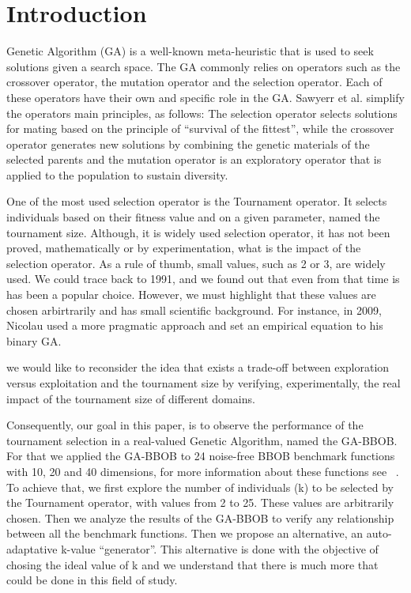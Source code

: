 \section{Introduction}\label{intro}

 Genetic Algorithm (GA) is a well-known meta-heuristic that is used to seek solutions given a search space. The GA commonly relies on operators such as the crossover operator, the mutation operator and the selection operator. Each of these operators have their own and specific role in the GA. Sawyerr et al. simplify the operators main principles, as follows: The selection operator selects solutions for mating based on the principle of ``survival of the fittest'', while the crossover operator generates new solutions by combining the genetic materials of the selected parents and the mutation operator is an exploratory operator that is applied to the population to sustain diversity.

 One of the most used selection operator is the Tournament operator. It selects individuals based on their fitness value and on a given parameter, named the tournament size. Although, it is widely used selection operator, it has not been proved, mathematically or by experimentation, what is the impact of the selection operator. As a rule of thumb, small values, such as 2 or 3, are widely used. We could trace back to 1991,  and we found out that even from that time is has been a popular choice. However, we must highlight that these values are chosen arbirtrarily and has small scientific background. For instance, in 2009, Nicolau used a more pragmatic approach and set an empirical equation to his binary GA. 
 
 
  we would like to reconsider the idea that exists a trade-off between exploration versus exploitation and the tournament size by verifying, experimentally, the real impact of the tournament size of different domains. 
 
 Consequently, our goal in this paper, is to observe the performance of the tournament selection in a real-valued Genetic Algorithm, named the GA-BBOB. For that we applied the GA-BBOB to 24 noise-free BBOB benchmark functions with 10, 20 and 40 dimensions, for more information about these functions see ~\cite{hansen2010real}. To achieve that, we first explore the number of individuals (k) to be selected by the Tournament operator, with values from 2 to 25. These values are arbitrarily chosen. Then we analyze the results of the GA-BBOB to verify any relationship between all the benchmark functions. Then we propose an alternative, an auto-adaptative k-value ``generator''. This alternative is done with the objective of chosing the ideal value of k and we understand that there is much more that could be done in this field of study.

